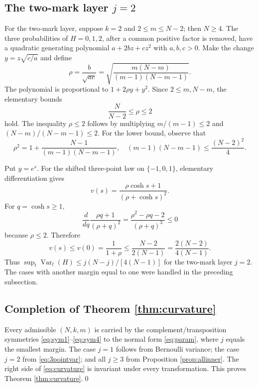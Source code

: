 \documentclass[11pt,a4paper]{article}
\DeclareMathOperator{\Var}{Var}\DeclareMathOperator{\Cov}{Cov}\DeclareMathOperator{\Hyp}{Hyp}\DeclareMathOperator{\Bern}{Bern}\DeclareMathOperator{\supp}{supp}\DeclareMathOperator{\artanh}{artanh}
\begin{document}
\subsection{The two-mark layer \texorpdfstring{$j=2$}{j = 2}}
For the two-mark layer, suppose $k=2$ and $2\le m\le N-2$; then $N\ge4$. The three probabilities of $H=0,1,2$, after a common positive factor is removed, have a quadratic generating polynomial $a+2bz+cz^2$ with $a,b,c>0$. Make the change $y=z\sqrt{c/a}$ and define
\[
 \rho=\frac b{\sqrt{ac}}
 =\sqrt{\frac{m(N-m)}{(m-1)(N-m-1)}}.
\]
The polynomial is proportional to $1+2\rho y+y^2$. Since $2\le m,N-m$, the elementary bounds
\[
 \frac{N}{N-2}\le\rho\le2
\]
hold. The inequality $\rho\le2$ follows by multiplying $m/(m-1)\le2$ and $(N-m)/(N-m-1)\le2$. For the lower bound, observe that
\[
 \rho^2=1+\frac{N-1}{(m-1)(N-m-1)},
 \quad (m-1)(N-m-1)\le\frac{(N-2)^2}4.
\]

Put $y=e^s$. For the shifted three-point law on $\{-1,0,1\}$, elementary differentiation gives
\begin{equation}\label{eq:3pointvar}
 v(s)=\frac{\rho\cosh s+1}{(\rho+\cosh s)^2}.
\end{equation}
For $q=\cosh s\ge1$,
\[
 \frac{d}{dq}\frac{\rho q+1}{(\rho+q)^2}
 =\frac{\rho^2-\rho q-2}{(\rho+q)^3}\le0
\]
because $\rho\le2$. Therefore
\[
 v(s)\le v(0)=\frac1{1+\rho}
 \le\frac{N-2}{2(N-1)}=
 \frac{2(N-2)}{4(N-1)}.
\]
Thus $\sup_t\Var_t(H)\le j(N-j)/[4(N-1)]$ for the two-mark layer $j=2$. The cases with another margin equal to one were handled in the preceding subsection.

\subsection{Completion of Theorem \ref{thm:curvature}}
Every admissible $(N,k,m)$ is carried by the complement/transposition symmetries \eqref{eq:sym1}--\eqref{eq:sym4} to the normal form \eqref{eq:param}, where $j$ equals the smallest margin. The case $j=1$ follows from Bernoulli variance; the case $j=2$ from \eqref{eq:3pointvar}; and all $j\ge3$ from Proposition \ref{prop:allinner}. The right side of \eqref{eq:curvature} is invariant under every transformation. This proves Theorem \ref{thm:curvature}.\qed


\end{document}

